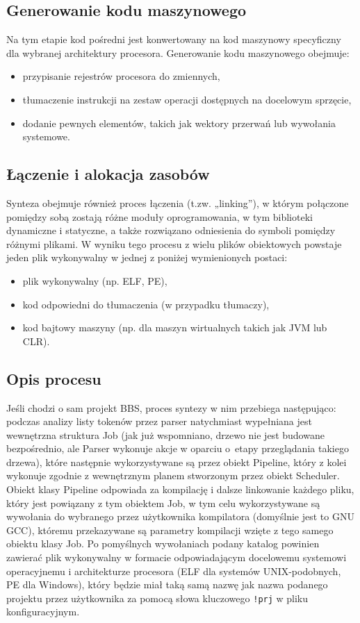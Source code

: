\subsection{Generowanie kodu maszynowego}
Na tym etapie kod pośredni jest konwertowany na kod maszynowy specyficzny dla wybranej architektury procesora. Generowanie kodu maszynowego obejmuje:

\begin{itemize}
    \item przypisanie rejestrów procesora do zmiennych,
    \item tłumaczenie instrukcji na zestaw operacji dostępnych na docelowym sprzęcie,
    \item dodanie pewnych elementów, takich jak wektory przerwań lub wywołania systemowe.
\end{itemize}

\subsection{Łączenie i alokacja zasobów}
Synteza obejmuje również proces łączenia (t.zw. „linking”), w którym połączone pomiędzy sobą zostają różne moduły oprogramowania, w tym biblioteki dynamiczne i statyczne, a także rozwiązano odniesienia do symboli pomiędzy różnymi plikami. W wyniku tego procesu z wielu plików obiektowych powstaje jeden plik wykonywalny w jednej z poniżej wymienionych postaci:

\begin{itemize}
    \item plik wykonywalny (np. ELF, PE),
    \item kod odpowiedni do tłumaczenia (w przypadku tłumaczy),
    \item kod bajtowy maszyny (np. dla maszyn wirtualnych takich jak JVM lub CLR).
\end{itemize}

\subsection{Opis procesu}

Jeśli chodzi o sam projekt BBS, proces syntezy w nim przebiega następująco: podczas analizy listy tokenów przez parser natychmiast wypełniana jest wewnętrzna struktura Job (jak już wspomniano, drzewo nie jest budowane bezpośrednio, ale Parser wykonuje akcje w oparciu o~etapy przeglądania takiego drzewa), które następnie wykorzystywane są przez obiekt Pipeline, który z kolei wykonuje zgodnie z wewnętrznym planem stworzonym przez obiekt Scheduler. Obiekt klasy Pipeline odpowiada za kompilację i dalsze linkowanie każdego pliku, który jest powiązany z tym obiektem Job, w tym celu wykorzystywane są wywołania do wybranego przez użytkownika kompilatora (domyślnie jest to GNU GCC), któremu przekazywane są parametry kompilacji wzięte z tego samego obiektu klasy Job. Po pomyślnych wywołaniach podany katalog powinien zawierać plik wykonywalny w formacie odpowiadającym docelowemu systemowi operacyjnemu i architekturze procesora (ELF dla systemów UNIX-podobnych, PE dla Windows), który będzie miał taką samą nazwę jak nazwa podanego projektu przez użytkownika za pomocą słowa kluczowego \texttt{!prj} w pliku konfiguracyjnym.

